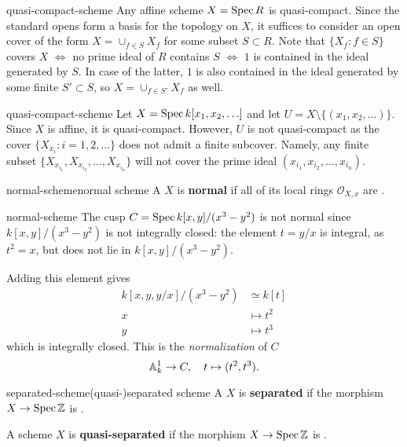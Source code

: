 \begin{example}{quasi-compact-scheme}
    Any affine scheme $X = \Spec R$ is quasi-compact. Since the standard opens form a basis for the topology on $X$, it suffices to consider an open cover of the form $X = \cup_{f \in S} X_f$ for some subset $S \subset R$. Note that $\{ X_f : f \in S \}$ covers $X$ $\iff$ no prime ideal of $R$ contains $S$ $\iff$ $1$ is contained in the ideal generated by $S$. In case of the latter, $1$ is also contained in the ideal generated by some finite $S' \subset S$, so $X = \cup_{f \in S'} X_f$ as well.
\end{example}

\begin{example}{quasi-compact-scheme}
    Let $X = \Spec k[x_1, x_2, \ldots]$ and let $U = X \setminus \{ (x_1, x_2, \ldots) \}$. Since $X$ is affine, it is quasi-compact. However, $U$ is not quasi-compact as the cover $\{ X_{x_i} : i = 1, 2, \ldots \}$ does not admit a finite subcover. Namely, any finite subset $\{ X_{x_{i_1}}, X_{x_{i_2}}, \ldots, X_{x_{i_n}} \}$ will not cover the prime ideal $(x_{i_1}, x_{i_2}, \ldots, x_{i_n})$.
\end{example}

\begin{topic}{normal-scheme}{normal scheme}
    A  $X$ is \textbf{normal} if all of its local rings $\mathcal{O}_{X,x}$ are  .
\end{topic}

\begin{example}{normal-scheme}
    The cusp $C = \Spec k[x, y] / (x^3 - y^2)$ is not normal since $k[x, y] / (x^3 - y^2)$ is not integrally closed: the element $t = y/x$ is integral, as $t^2 = x$, but does not lie in $k[x, y] / (x^3 - y^2)$.
    
    Adding this element gives
    \[ \begin{aligned}
        k[x, y, y/x] / (x^3 - y^2) &\simeq k[t] \\
        x &\mapsto t^2 \\
        y &\mapsto t^3
    \end{aligned} \]
    which is integrally closed. This is the \textit{normalization} of $C$
    \[ \AA_k^1 \to C, \quad t \mapsto (t^2, t^3) . \]
\end{example}

\begin{topic}{separated-scheme}{(quasi-)separated scheme}
    A  $X$ is \textbf{separated} if the morphism $X \to \Spec \ZZ$ is .
    
    A scheme $X$ is \textbf{quasi-separated} if the morphism $X \to \Spec \ZZ$ is .
\end{topic}


